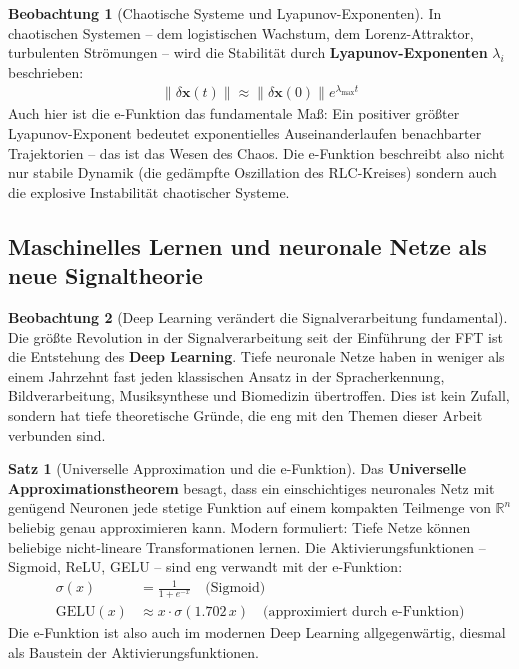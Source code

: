 ﻿\documentclass[a4paper,12pt]{report}
\theoremstyle{definition}
\newtheorem{satz}{Satz}
\newtheorem{beobachtung}{Beobachtung}
\begin{document}
	\begin{beobachtung}[Chaotische Systeme und Lyapunov-Exponenten]
		In chaotischen Systemen -- dem logistischen Wachstum, dem Lorenz-Attraktor, turbulenten Strömungen -- wird die Stabilität durch \textbf{Lyapunov-Exponenten} $\lambda_i$ beschrieben:
		\begin{align}
			\|\delta\mathbf{x}(t)\| \approx \|\delta\mathbf{x}(0)\| e^{\lambda_{\max} t}
		\end{align}
		Auch hier ist die e-Funktion das fundamentale Maß: Ein positiver größter Lyapunov-Exponent bedeutet exponentielles Auseinanderlaufen benachbarter Trajektorien -- das ist das Wesen des Chaos. Die e-Funktion beschreibt also nicht nur stabile Dynamik (die gedämpfte Oszillation des RLC-Kreises) sondern auch die explosive Instabilität chaotischer Systeme.
	\end{beobachtung}
	
	\subsection{Maschinelles Lernen und neuronale Netze als neue Signaltheorie}
	
	\begin{beobachtung}[Deep Learning verändert die Signalverarbeitung fundamental]
		Die größte Revolution in der Signalverarbeitung seit der Einführung der FFT ist die Entstehung des \textbf{Deep Learning}. Tiefe neuronale Netze haben in weniger als einem Jahrzehnt fast jeden klassischen Ansatz in der Spracherkennung, Bildverarbeitung, Musiksynthese und Biomedizin übertroffen. Dies ist kein Zufall, sondern hat tiefe theoretische Gründe, die eng mit den Themen dieser Arbeit verbunden sind.
	\end{beobachtung}
	
	\begin{satz}[Universelle Approximation und die e-Funktion]
		Das \textbf{Universelle Approximationstheorem} besagt, dass ein einschichtiges neuronales Netz mit genügend Neuronen jede stetige Funktion auf einem kompakten Teilmenge von $\mathbb{R}^n$ beliebig genau approximieren kann. Modern formuliert: Tiefe Netze können beliebige nicht-lineare Transformationen lernen. Die Aktivierungsfunktionen -- Sigmoid, ReLU, GELU -- sind eng verwandt mit der e-Funktion:
		\begin{align}
			\sigma(x) &= \frac{1}{1 + e^{-x}} \quad \text{(Sigmoid)} \\
			\text{GELU}(x) &\approx x \cdot \sigma(1.702\, x) \quad \text{(approximiert durch e-Funktion)}
		\end{align}
		Die e-Funktion ist also auch im modernen Deep Learning allgegenwärtig, diesmal als Baustein der Aktivierungsfunktionen.
	\end{satz}
	
\end{document}
